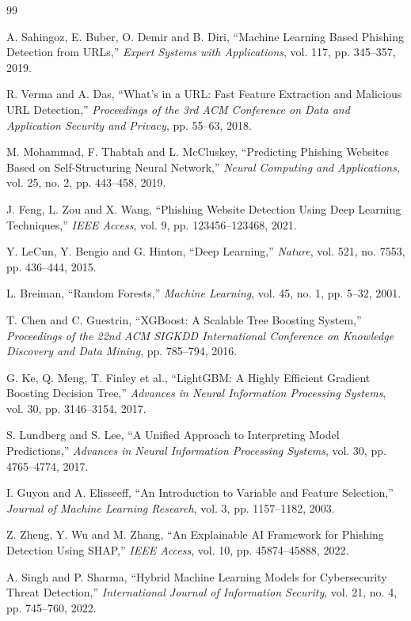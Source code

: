 \documentclass[12pt]{report}
\begin{document}
\begin{thebibliography}{99}

A. Sahingoz, E. Buber, O. Demir and B. Diri,
``Machine Learning Based Phishing Detection from URLs,''
\textit{Expert Systems with Applications},
vol. 117, pp. 345--357, 2019.

R. Verma and A. Das,
``What's in a URL: Fast Feature Extraction and Malicious URL Detection,''
\textit{Proceedings of the 3rd ACM Conference on Data and Application Security and Privacy},
pp. 55--63, 2018.

M. Mohammad, F. Thabtah and L. McCluskey,
``Predicting Phishing Websites Based on Self-Structuring Neural Network,''
\textit{Neural Computing and Applications},
vol. 25, no. 2, pp. 443--458, 2019.

J. Feng, L. Zou and X. Wang,
``Phishing Website Detection Using Deep Learning Techniques,''
\textit{IEEE Access},
vol. 9, pp. 123456--123468, 2021.

Y. LeCun, Y. Bengio and G. Hinton,
``Deep Learning,''
\textit{Nature},
vol. 521, no. 7553, pp. 436--444, 2015.

L. Breiman,
``Random Forests,''
\textit{Machine Learning},
vol. 45, no. 1, pp. 5--32, 2001.

T. Chen and C. Guestrin,
``XGBoost: A Scalable Tree Boosting System,''
\textit{Proceedings of the 22nd ACM SIGKDD International Conference on Knowledge Discovery and Data Mining},
pp. 785--794, 2016.

G. Ke, Q. Meng, T. Finley et al.,
``LightGBM: A Highly Efficient Gradient Boosting Decision Tree,''
\textit{Advances in Neural Information Processing Systems},
vol. 30, pp. 3146--3154, 2017.

S. Lundberg and S. Lee,
``A Unified Approach to Interpreting Model Predictions,''
\textit{Advances in Neural Information Processing Systems},
vol. 30, pp. 4765--4774, 2017.

I. Guyon and A. Elisseeff,
``An Introduction to Variable and Feature Selection,''
\textit{Journal of Machine Learning Research},
vol. 3, pp. 1157--1182, 2003.

Z. Zheng, Y. Wu and M. Zhang,
``An Explainable AI Framework for Phishing Detection Using SHAP,''
\textit{IEEE Access},
vol. 10, pp. 45874--45888, 2022.

A. Singh and P. Sharma,
``Hybrid Machine Learning Models for Cybersecurity Threat Detection,''
\textit{International Journal of Information Security},
vol. 21, no. 4, pp. 745--760, 2022.


\end{thebibliography}
\end{document}
